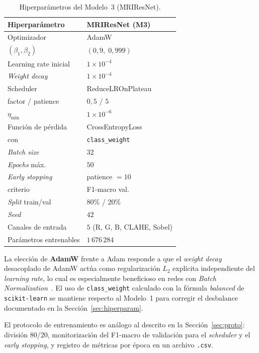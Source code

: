 \begin{table}[!t]
\centering
\caption{Hiperparámetros del Modelo~3 (MRIResNet).}
\label{tab:hiperparam-m3}
\renewcommand{\arraystretch}{1.15}
\footnotesize
\begin{tabular}{@{}ll@{}}
\toprule
\textbf{Hiperparámetro} & \textbf{MRIResNet (M3)} \\
\midrule
Optimizador                 & AdamW                     \\
\quad $(\beta_1, \beta_2)$  & $(0{,}9,\;0{,}999)$       \\
Learning rate inicial       & $1\times10^{-4}$          \\
\textit{Weight decay}       & $1\times10^{-4}$          \\
Scheduler                   & ReduceLROnPlateau         \\
\quad factor / patience     & $0{,}5$ / $5$             \\
\quad $\eta_{\min}$         & $1\times10^{-6}$          \\
Función de pérdida          & CrossEntropyLoss          \\
\quad con                   & \texttt{class\_weight}    \\
\textit{Batch size}         & $32$                      \\
\textit{Epochs} máx.        & $50$                      \\
\textit{Early stopping}     & patience $= 10$           \\
\quad criterio              & F1-macro val.             \\
\textit{Split} train/val  & 80\% / 20\% \\
\textit{Seed}               & $42$                      \\
\midrule
Canales de entrada          & $5$ (R, G, B, CLAHE, Sobel) \\
Parámetros entrenables      & $1\,676\,284$             \\
\bottomrule
\end{tabular}
\end{table}

La elección de \textbf{AdamW} frente a Adam responde a que el
\textit{weight decay} desacoplado de AdamW actúa como
regularización $L_2$ explícita independiente del \textit{learning
rate}, lo cual es especialmente beneficioso en redes con
\textit{Batch Normalization}~\cite{loshchilov2019adamw}.
El uso de \texttt{class\_weight} calculado con la fórmula
\textit{balanced} de \texttt{scikit-learn} se mantiene respecto
al Modelo~1 para corregir el desbalance documentado en la
Sección~\ref{sec:hiperparam}.

El protocolo de entrenamiento es análogo al descrito en la
Sección~\ref{sec:proto}: división 80/20, monitorización del
F1-macro de validación para el \textit{scheduler} y el
\textit{early stopping}, y registro de métricas por época en
un archivo \texttt{.csv}.
